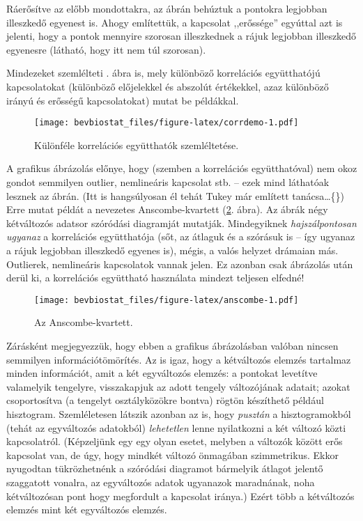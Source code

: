 \documentclass[]{book}
\begin{document}
Ráerősítve az előbb mondottakra, az ábrán behúztuk a pontokra legjobban illeszkedő egyenest is. Ahogy említettük, a kapcsolat ,,erőssége'' egyúttal azt is jelenti, hogy a pontok mennyire szorosan illeszkednek a rájuk legjobban illeszkedő egyenesre (látható, hogy itt nem túl szorosan).

Mindezeket szemlélteti . ábra is, mely különböző korrelációs együtthatójú kapcsolatokat (különböző előjelekkel és abszolút értékekkel, azaz különböző irányú és erősségű kapcsolatokat) mutat be példákkal.

\begin{figure}
\centering
\texttt{[image: bevbiostat\_files/figure-latex/corrdemo-1.pdf]}
\caption{\label{fig:corrdemo}Különféle korrelációs együtthatók szemléltetése.}
\end{figure}

A grafikus ábrázolás előnye, hogy (szemben a korrelációs együtthatóval) nem okoz gondot semmilyen outlier, nemlineáris kapcsolat stb. -- ezek mind láthatóak lesznek az ábrán. (Itt is hangsúlyosan él tehát Tukey már említett tanácsa\dots\{\}) Erre mutat példát a nevezetes Anscombe-kvartett (\ref{fig:anscombe}. ábra). Az ábrák négy kétváltozós adatsor szóródási diagramját mutatják. Mindegyiknek \emph{hajszálpontosan ugyanaz} a korrelációs együtthatója (sőt, az átlaguk és a szórásuk is -- így ugyanaz a rájuk legjobban illeszkedő egyenes is), mégis, a valós helyzet drámaian más. Outlierek, nemlineáris kapcsolatok vannak jelen. Ez azonban csak ábrázolás után derül ki, a korrelációs együttható használata mindezt teljesen elfedné!

\begin{figure}
\centering
\texttt{[image: bevbiostat\_files/figure-latex/anscombe-1.pdf]}
\caption{\label{fig:anscombe}Az Anscombe-kvartett.}
\end{figure}

Zárásként megjegyezzük, hogy ebben a grafikus ábrázolásban valóban nincsen semmilyen információtömörítés. Az is igaz, hogy a kétváltozós elemzés tartalmaz minden információt, amit a két egyváltozós elemzés: a pontokat levetítve valamelyik tengelyre, visszakapjuk az adott tengely változójának adatait; azokat csoportosítva (a tengelyt osztályközökre bontva) rögtön készíthető például hisztogram. Szemléletesen látszik azonban az is, hogy \emph{pusztán} a hisztogramokból (tehát az egyváltozós adatokból) \emph{lehetetlen} lenne nyilatkozni a két változó közti kapcsolatról. (Képzeljünk egy egy olyan esetet, melyben a változók között erős kapcsolat van, de úgy, hogy mindkét változó önmagában szimmetrikus. Ekkor nyugodtan tükrözhetnénk a szóródási diagramot bármelyik átlagot jelentő szaggatott vonalra, az egyváltozós adatok ugyanazok maradnának, noha kétváltozósan pont hogy megfordult a kapcsolat iránya.) Ezért több a kétváltozós elemzés mint két egyváltozós elemzés.
\end{document}

